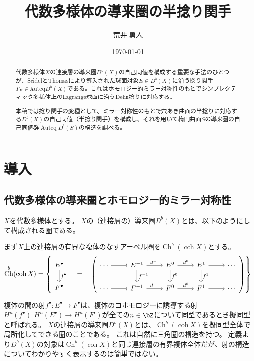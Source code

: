 \documentclass[uplatex,a4paper,dvipdfmx]{jsarticle}
\title{代数多様体の導来圏の半捻り関手}
\author{荒井 勇人}
\date{\today}
\theoremstyle{plain}
\theoremstyle{definition}
\DeclareMathOperator{\Auteq}{\mathrm{Auteq}}
\DeclareMathOperator{\Ch}{\mathrm{Ch}}
\DeclareMathOperator{\coh}{\mathrm{coh}}
\begin{document}
\maketitle

\begin{abstract}
	代数多様体$X$の連接層の導来圏$D^b(X)$の自己同値を構成する重要な手法のひとつが、SeidelとThomasにより導入された球面対象$E \in D^b(X)$に沿う捻り関手$T_E \in \mathrm{Auteq} D^b(X)$である。これはホモロジー的ミラー対称性のもとでシンプレクティック多様体上のLagrange球面に沿うDehn捻りに対応する。

	本稿では捻り関手の変種として、ミラー対称性のもとで穴あき曲面の半捻りに対応する$D^b(X)$の自己同値（半捻り関手）を構成し、それを用いて楕円曲面$S$の導来圏の自己同値群$\Auteq D^b(S)$の構造を調べる。
\end{abstract}

\section{導入}
\subsection{代数多様体の導来圏とホモロジー的ミラー対称性}
$X$を代数多様体とする。
$X$の（連接層の）導来圏$D^b(X)$とは、以下のようにして構成される圏である。

まず$X$上の連接層の有界な複体のなすアーベル圏を$\Ch^b(\coh X)$とする。
\begin{equation}
	\Ch^b(\coh X) = \left\{
	  \begin{tikzcd}
		  E^\bullet \arrow[d, "f^\bullet", name=F]\\
		  F^\bullet
	  \end{tikzcd}
	  \quad = \quad
	  \left(
	  \begin{tikzcd}
			  \cdots \arrow[r] &E^{-1} \arrow[r, "d^{-1}"]\arrow[d, "f^{-1}"] &E^0 \arrow[r, "d^{0}"]\arrow[d, "f^{0}"] &E^1 \arrow[d, "f^{1}"] \arrow[r] &\cdots\\
			  \cdots \arrow[r] &F^{-1} \arrow[r, "d^{-1}"] &F^0 \arrow[r, "d^{0}"] &F^1\arrow[r] &\cdots
		  \end{tikzcd}
	  \right)
	\right\}
\end{equation}


複体の間の射$f^\bullet \colon E^\bullet \to F^\bullet$は、複体のコホモロジーに誘導する射$H^n(f^\bullet) \colon H^n(E^\bullet) \to H^n(F^\bullet)$が全ての$n \in \bZ$について同型であるとき擬同型と呼ばれる。
$X$の連接層の導来圏$D^b(X)$とは、$\Ch^b(\coh X)$を擬同型全体で局所化してできる圏のことである。
これは自然に三角圏の構造を持つ。
定義より$D^b(X)$の対象は$\Ch^b(\coh X)$と同じ連接層の有界複体全体だが、射の構造についてわかりやすく表示するのは簡単ではない。
\end{document}
